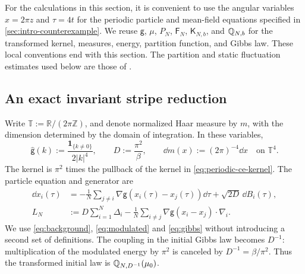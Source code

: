 \documentclass[11pt,reqno]{amsart}
\numberwithin{equation}{section}
\theoremstyle{plain}
\theoremstyle{remark}
\newcommand{\T}{\mathbb T}\newcommand{\R}{\mathbb R}\newcommand{\Z}{\mathbb Z}
\newcommand{\K}{\mathsf K}\newcommand{\g}{\mathsf g}\newcommand{\Fr}{\mathsf F}
\begin{document}
For the calculations in this section, it is convenient to use the angular variables $x=2\pi z$ and $\tau=4t$ for the periodic particle and mean-field equations specified in \cref{sec:intro-counterexample}. We reuse $\g$, $\mu$, $P_N$, $\Fr_N$, $\K_{N,b}$, and $\mathbb Q_{N,b}$ for the transformed kernel, measures, energy, partition function, and Gibbs law. These local conventions end with this section. The partition and static fluctuation estimates used below are those of \cite{DGRpartition}.

\subsection{An exact invariant stripe reduction}\label{ce:sec:stripe}

Write $\T:=\R/(2\pi\Z)$, and denote normalized Haar measure by $m$, with the dimension determined by the domain of integration. In these variables,
\begin{equation}\label{ce:eq:angkernel}
 \widehat{\g}(k):=\frac{\mathbf 1_{\{k\ne0\}}}{2|k|^4},\qquad D:=\frac{\pi^2}{\beta},\qquad
 \dd m(x):=(2\pi)^{-4}\dd x\quad\text{on }\T^4.
\end{equation}
The kernel is $\pi^2$ times the pullback of the kernel in \eqref{eq:periodic-ce-kernel}. The particle equation and generator are
\begin{align}
 \dd x_i(\tau)&=-\frac1N\sum_{j\ne i}\nabla\g(x_i(\tau)-x_j(\tau))\dd\tau
 +\sqrt{2D}\,\dd B_i(\tau),\label{ce:eq:angular-sde}\\
 L_N&:=D\sum_{i=1}^N\Delta_i-\frac1N\sum_{i\ne j}\nabla\g(x_i-x_j)\cdot\nabla_i.\label{ce:eq:angular-generator}
\end{align}
We use \eqref{eq:background}, \eqref{eq:modulated} and \eqref{eq:gibbs} without introducing a second set of definitions. The coupling in the initial Gibbs law becomes $D^{-1}$: multiplication of the modulated energy by $\pi^2$ is canceled by $D^{-1}=\beta/\pi^2$. Thus the transformed initial law is $\mathbb Q_{N,D^{-1}}(\mu_0)$.
\end{document}
